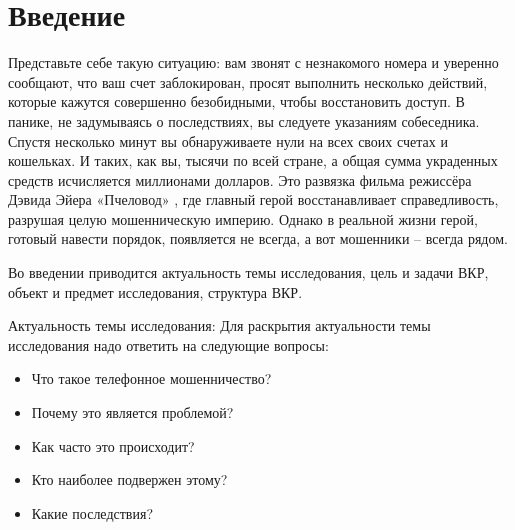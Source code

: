 \section*{\centering Введение}

Представьте себе такую ситуацию: вам звонят с незнакомого номера и уверенно сообщают, что ваш счет заблокирован, просят выполнить несколько действий, которые кажутся совершенно безобидными, чтобы восстановить доступ. В панике, не задумываясь о последствиях, вы следуете указаниям собеседника. Спустя несколько минут вы обнаруживаете нули на всех своих счетах и кошельках. И таких, как вы, тысячи по всей стране, а общая сумма украденных средств исчисляется миллионами долларов. Это развязка фильма режиссёра Дэвида Эйера «Пчеловод» \cite{beekeeper24}, где главный герой восстанавливает справедливость, разрушая целую мошенническую империю. Однако в реальной жизни герой, готовый навести порядок, появляется не всегда, а вот мошенники – всегда рядом.

Во введении приводится актуальность темы исследования, цель и задачи ВКР, объект и предмет исследования, структура ВКР.

Актуальность темы исследования:
Для раскрытия актуальности темы исследования надо ответить на следующие вопросы:
\begin{itemize}
	\item Что такое телефонное мошенничество?
	\item Почему это является проблемой?
	\item Как часто это происходит?
	\item Кто наиболее подвержен этому?
	\item Какие последствия?
\end{itemize}

\newpage